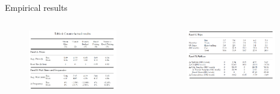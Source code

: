 \documentclass[10pt, aspectratio=169]{beamer}
\begin{document}
\begin{frame}

\end{frame}

\begin{frame}

\end{frame}

\begin{frame}{Empirical results}
  \begin{columns}[T,onlytextwidth]

    \begin{figure}
      \centering
      \includegraphics[width=0.9\textwidth]{../Figures/counter1.png}
    \end{figure}


    \begin{figure}
      \centering
      \includegraphics[width=0.9\textwidth]{../Figures/counter2.png}
    \end{figure}
  \end{columns}
\end{frame}
\end{document}
